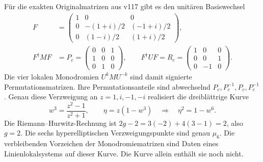Für die exakten Originalmatrizen aus v117 gibt es den unitären Basiswechsel
\begin{equation}
\begin{aligned}
F&=\begin{pmatrix}
1&0&0\\
0&-(1+i)/2&(-1+i)/2\\
0&(1-i)/2&(1+i)/2
\end{pmatrix},\\
F^\dagger MF&=P_c=\begin{pmatrix}0&0&1\\1&0&0\\0&1&0\end{pmatrix},
\qquad
F^\dagger UF=R_c=\begin{pmatrix}1&0&0\\0&0&1\\0&-1&0\end{pmatrix}.
\end{aligned}
\end{equation}
Die vier lokalen Monodromien $U^kMU^{-k}$ sind damit signierte Permutationsmatrizen. Ihre Permutationsanteile sind abwechselnd $P_c,P_c^{-1},P_c,P_c^{-1}$. Genau diese Verzweigung an $z=1,i,-1,-i$ realisiert die dreiblättrige Kurve
\begin{equation}\label{eq:flavorg2}
w^3=\frac{z^2-1}{z^2+1},
\qquad
\eta=z(1-w^3)
\quad\Longrightarrow\quad
\boxed{\eta^2=1-w^6.}
\end{equation}
Die Riemann--Hurwitz-Rechnung ist $2g-2=3(-2)+4(3-1)=2$, also $g=2$. Die sechs hyperelliptischen Verzweigungspunkte sind genau $\mu_6$. Die verbleibenden Vorzeichen der Monodromiematrizen sind Daten eines Linienlokalsystems auf dieser Kurve. Die Kurve allein enthält sie noch nicht.

